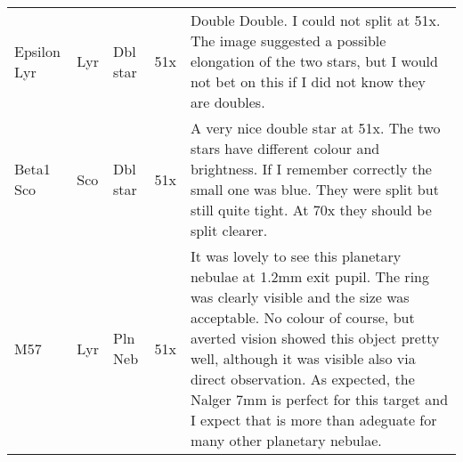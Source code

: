 \begin{longtable}{ p{0.8in}  p{0.3in}  p{0.5in}  p{0.9in}  p{5.8in} }
Epsilon Lyr & Lyr & Dbl star & 51x & Double Double. I could not split at 51x. The image suggested a possible elongation of the two stars, but I would not bet on this if I did not know they are doubles. \\ 
Beta1 Sco & Sco & Dbl star & 51x & A very nice double star at 51x. The two stars have different colour and brightness. If I remember correctly the small one was blue. They were split but still quite tight. At 70x they should be split clearer.  \\ 
M57 & Lyr & Pln Neb & 51x & It was lovely to see this planetary nebulae at 1.2mm exit pupil. The ring was clearly visible and the size was acceptable. No colour of course, but averted vision showed this object pretty well, although it was visible also via direct observation. As expected, the Nalger 7mm is perfect for this target and I expect that is more than adeguate for many other planetary nebulae. \\ 
\hline 
\end{longtable} 
